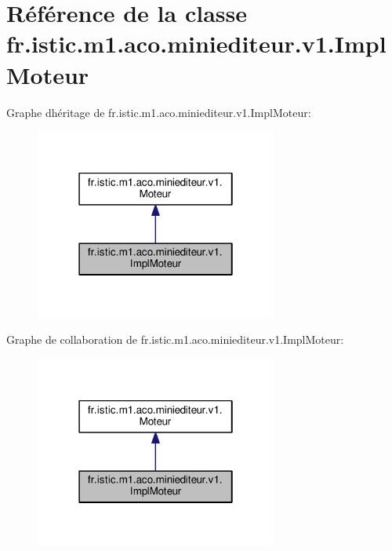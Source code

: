 \hypertarget{classfr_1_1istic_1_1m1_1_1aco_1_1miniediteur_1_1v1_1_1ImplMoteur}{}\section{Référence de la classe fr.\+istic.\+m1.\+aco.\+miniediteur.\+v1.\+Impl\+Moteur}
\label{classfr_1_1istic_1_1m1_1_1aco_1_1miniediteur_1_1v1_1_1ImplMoteur}


Graphe d\textquotesingle{}héritage de fr.\+istic.\+m1.\+aco.\+miniediteur.\+v1.\+Impl\+Moteur\+:\nopagebreak
\begin{figure}[H]
\begin{center}
\leavevmode
\includegraphics[width=226pt]{classfr_1_1istic_1_1m1_1_1aco_1_1miniediteur_1_1v1_1_1ImplMoteur__inherit__graph}
\end{center}
\end{figure}


Graphe de collaboration de fr.\+istic.\+m1.\+aco.\+miniediteur.\+v1.\+Impl\+Moteur\+:\nopagebreak
\begin{figure}[H]
\begin{center}
\leavevmode
\includegraphics[width=226pt]{classfr_1_1istic_1_1m1_1_1aco_1_1miniediteur_1_1v1_1_1ImplMoteur__coll__graph}
\end{center}
\end{figure}
